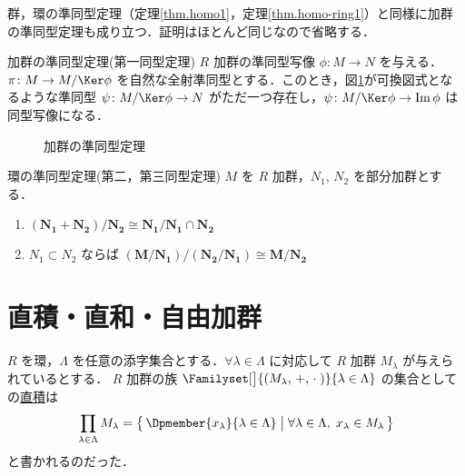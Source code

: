 \documentclass[geometry_main]{subfiles}
\begin{document}
群，環の準同型定理（定理\ref{thm.homo1}，定理\ref{thm.homo-ring1}）と同様に加群の準同型定理も成り立つ．証明はほとんど同じなので省略する．

\begin{mytheo}[label=thm.homo1]{加群の準同型定理(第一同型定理)}
	$R$ 加群の準同型写像 $\phi \colon M \to N$ を与える．
	$\pi \colon M \to M/\Ker \phi$ を自然な全射準同型とする．このとき，図\ref{fig.homo-module1}が可換図式となるような準同型 $\psi \colon M/\Ker \phi \to N$ がただ一つ存在し，$\psi \colon M/\Ker \phi \to \Im \phi$ は同型写像になる．
\end{mytheo}

\begin{figure}[H]
	\centering
	\caption{加群の準同型定理}
	\label{fig.homo-module1}
\end{figure}%

\begin{mytheo}[label=thm.homo-ring3]{環の準同型定理(第二，第三同型定理)}
	$M$ を $R$ 加群，$N_1,\, N_2$ を部分加群とする．
	\begin{enumerate}
		\item $\bm{(N_1+N_2)/N_2\cong N_1/N_1 \cap N_2}$ 
		\item $N_1 \subset N_2$ ならば $\bm{(M/N_1)/(N_2/N_1) \cong M/N_2}$
	\end{enumerate}
\end{mytheo}

\section{直積・直和・自由加群}

$R$ を環，$\Lambda$ を任意の添字集合とする．$\forall \lambda \in \Lambda$ に対応して $R$ 加群 $M_\lambda$ が与えられているとする．
$R$ 加群の族 $\Familyset[\big]{(M_\lambda,\, +,\, \cdot\mathrel{})}{\lambda \in \Lambda}$ の集合としての\hyperref[def:dp]{直積}は
\begin{align}
	\prod_{\lambda \in \Lambda} M_\lambda = \bigl\{\, \Dpmember{x_\lambda}{\lambda\in\Lambda} \bigm| \forall \lambda \in \Lambda,\; x_\lambda \in M_\lambda \,\bigr\} 
\end{align}
と書かれるのだった．
\end{document}
